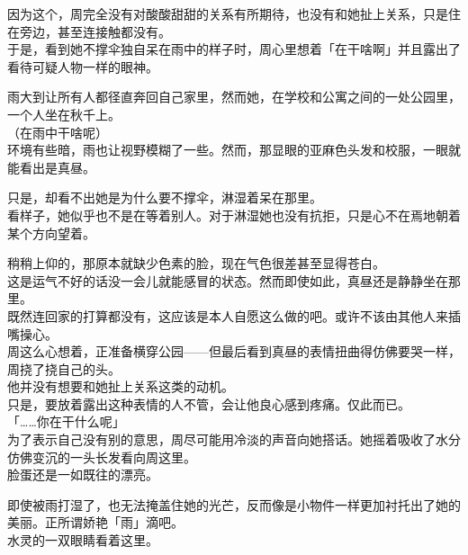 因为这个，周完全没有对酸酸甜甜的关系有所期待，也没有和她扯上关系，只是住在旁边，甚至连接触都没有。\\

于是，看到她不撑伞独自呆在雨中的样子时，周心里想着「在干啥啊」并且露出了看待可疑人物一样的眼神。\\

\vspace{2\baselineskip}

雨大到让所有人都径直奔回自己家里，然而她，在学校和公寓之间的一处公园里，一个人坐在秋千上。\\

（在雨中干啥呢）\\

环境有些暗，雨也让视野模糊了一些。然而，那显眼的亚麻色头发和校服，一眼就能看出是真昼。

只是，却看不出她是为什么要不撑伞，淋湿着呆在那里。\\

看样子，她似乎也不是在等着别人。对于淋湿她也没有抗拒，只是心不在焉地朝着某个方向望着。

稍稍上仰的，那原本就缺少色素的脸，现在气色很差甚至显得苍白。\\

这是运气不好的话没一会儿就能感冒的状态。然而即使如此，真昼还是静静坐在那里。\\

既然连回家的打算都没有，这应该是本人自愿这么做的吧。或许不该由其他人来插嘴操心。\\

周这么心想着，正准备横穿公园——但最后看到真昼的表情扭曲得仿佛要哭一样，周挠了挠自己的头。\\

他并没有想要和她扯上关系这类的动机。\\

只是，要放着露出这种表情的人不管，会让他良心感到疼痛。仅此而已。\\

「……你在干什么呢」\\

为了表示自己没有别的意思，周尽可能用冷淡的声音向她搭话。她摇着吸收了水分仿佛变沉的一头长发看向周这里。\\

脸蛋还是一如既往的漂亮。

即使被雨打湿了，也无法掩盖住她的光芒，反而像是小物件一样更加衬托出了她的美丽。正所谓娇艳「雨」滴吧。\\

水灵的一双眼睛看着这里。\\

